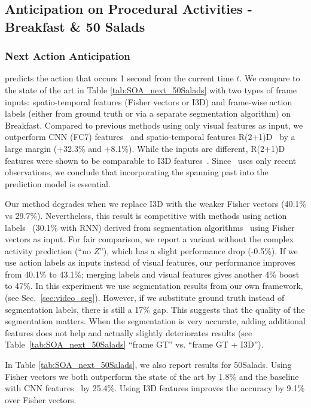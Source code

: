 \documentclass[runningheads]{llncs}
\begin{document}
\subsection{Anticipation on Procedural Activities - Breakfast \& 50 Salads} \label{sec:instructional_act}

\subsubsection{Next Action Anticipation}\label{sec:next_action}
predicts the action that occurs 1 second from the current time $t$. We compare to the state of the art in Table \ref{tab:SOA_next_50Salads} with two types of frame inputs: spatio-temporal features (Fisher vectors or I3D) and frame-wise action labels (either from ground truth or via a separate segmentation algorithm) on Breakfast. Compared to previous methods using only visual features as input, we outperform CNN (FC7) features~\cite{vondrick2016anticipating} and spatio-temporal features R(2+1)D~\cite{miech2019leveraging} by a large margin (+32.3\% and +8.1\%). While the inputs are different, R(2+1)D features were shown to be comparable to I3D features~\cite{tran2018closer}. Since~\cite{miech2019leveraging} uses only recent observations, we conclude that incorporating the spanning past into the prediction model is essential.

Our method degrades when we replace I3D with the weaker Fisher vectors (40.1\% vs 29.7\%). Nevertheless, this result is competitive with methods using action labels~\cite{abu2018will} (30.1\% with RNN) derived from segmentation algorithms~\cite{richard2017weakly} using Fisher vectors as input. For fair comparison, we report a variant without the complex activity prediction (``no $Z$''), which has a slight performance drop (-0.5\%).  If we use action labels as inputs instead of visual features, our performance improves from 40.1\% to 43.1\%; merging labels and visual features gives another 4\% boost to 47\%. In this experiment we use segmentation results from our own framework,  
(see Sec.~\ref{sec:video_seg}). However, if we substitute ground truth instead of segmentation labels, there is still a 17\% gap. This suggests that the quality of the segmentation matters. When the segmentation is very accurate, adding additional features does not help and actually slightly deteriorates results (see Table~\ref{tab:SOA_next_50Salads} ``frame GT'' vs. ``frame GT + I3D'').

In Table \ref{tab:SOA_next_50Salads}, we also report results for 50Salads. Using Fisher vectors we both outperform the state of the art by 1.8\% and the baseline with CNN features~\cite{vondrick2016anticipating} by 25.4\%. Using I3D features improves the accuracy by 9.1\% over Fisher vectors.
\end{document}
